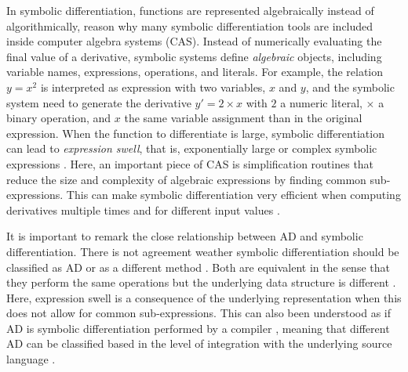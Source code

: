 In symbolic differentiation, functions are represented algebraically instead of algorithmically, reason why many symbolic differentiation tools are included inside computer algebra systems (CAS)\cite{Symbolics_jl_2022}. 
Instead of numerically evaluating the final value of a derivative, symbolic systems define \textit{algebraic} objects, including variable names, expressions, operations, and literals. 
For example, the relation $y = x^2$ is interpreted as expression with two variables, $x$ and $y$, and the symbolic system need to generate the derivative $y' = 2 \times x$ with $2$ a numeric literal, $\times$ a binary operation, and $x$ the same variable assignment than in the original expression.
When the function to differentiate is large, symbolic differentiation can lead to \textit{expression swell}, that is, exponentially large or complex symbolic expressions \cite{Baydin_Pearlmutter_Radul_Siskind_2015}.
Here, an important piece of CAS is simplification routines that reduce the size and complexity of algebraic expressions by finding common sub-expressions.  
This can make symbolic differentiation very efficient when computing derivatives multiple times and for different input values \cite{Dürrbaum_Klier_Hahn_2002}. 

It is important to remark the close relationship between AD and symbolic differentiation.
There is not agreement weather symbolic differentiation should be classified as AD\cite{juedes1991taxonomy, Elliott_2018, Laue2020} or as a different method \cite{Baydin_Pearlmutter_Radul_Siskind_2015}.  
Both are equivalent in the sense that they perform the same operations but the underlying data structure is different \cite{Laue2020}. 
Here, expression swell is a consequence of the underlying representation when this does not allow for common sub-expressions. 
This can also been understood as if AD is symbolic differentiation performed by a compiler \cite{Elliott_2018}, meaning that different AD can be classified based in the level of integration with the underlying source language \cite{juedes1991taxonomy}.

